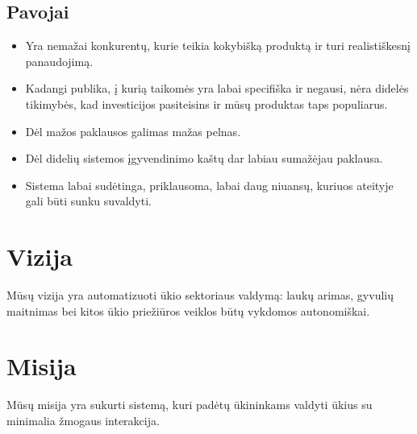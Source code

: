 \documentclass[oneside]{VUMIFPSkursinis}
\begin{document}
	\subsection{Pavojai}
	\begin{itemize}
	\item Yra nemažai konkurentų, kurie teikia kokybišką produktą ir turi realistiškesnį panaudojimą.
	\item Kadangi publika, į kurią taikomės yra labai specifiška ir negausi, nėra didelės tikimybės, kad investicijos pasiteisins ir mūsų produktas taps populiarus.
	\item Dėl mažos paklausos galimas mažas pelnas.
	\item Dėl didelių sistemos įgyvendinimo kaštų dar labiau sumažėjau paklausa.
	\item Sistema labai sudėtinga, priklausoma, labai daug niuansų, kuriuos ateityje gali būti sunku suvaldyti.
	\end{itemize}
	
\section{Vizija}
Mūsų vizija yra automatizuoti ūkio sektoriaus valdymą: laukų arimas, gyvulių maitnimas bei kitos ūkio priežiūros veiklos būtų vykdomos autonomiškai.
\section{Misija}
Mūsų misija yra sukurti sistemą, kuri padėtų ūkininkams valdyti ūkius su minimalia žmogaus interakcija.
\end{document}

